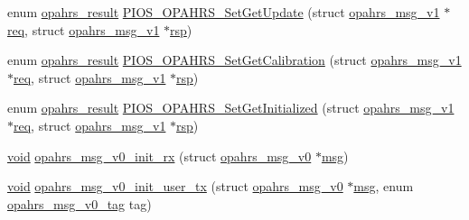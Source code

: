 \begin{DoxyCompactItemize}
\item 
enum \hyperlink{group___p_i_o_s___o_p_a_h_r_s_gaf6fe64d28ea92983e870494d0a5d05bd}{opahrs\-\_\-result} \hyperlink{group___p_i_o_s___o_p_a_h_r_s_ga4633695459517529c7841b3d2bb5dccf}{P\-I\-O\-S\-\_\-\-O\-P\-A\-H\-R\-S\-\_\-\-Set\-Get\-Update} (struct \hyperlink{structopahrs__msg__v1}{opahrs\-\_\-msg\-\_\-v1} $\ast$\hyperlink{pios__opahrs__proto_8h_ad651fd9affe5ed0ac9abccd8e2791a2c}{req}, struct \hyperlink{structopahrs__msg__v1}{opahrs\-\_\-msg\-\_\-v1} $\ast$\hyperlink{pios__opahrs__proto_8h_a33704cbdda2899ee80b99a109f814568}{rsp})
\item 
enum \hyperlink{group___p_i_o_s___o_p_a_h_r_s_gaf6fe64d28ea92983e870494d0a5d05bd}{opahrs\-\_\-result} \hyperlink{group___p_i_o_s___o_p_a_h_r_s_gadc32051065da8842b2a3e4416783ff2a}{P\-I\-O\-S\-\_\-\-O\-P\-A\-H\-R\-S\-\_\-\-Set\-Get\-Calibration} (struct \hyperlink{structopahrs__msg__v1}{opahrs\-\_\-msg\-\_\-v1} $\ast$\hyperlink{pios__opahrs__proto_8h_ad651fd9affe5ed0ac9abccd8e2791a2c}{req}, struct \hyperlink{structopahrs__msg__v1}{opahrs\-\_\-msg\-\_\-v1} $\ast$\hyperlink{pios__opahrs__proto_8h_a33704cbdda2899ee80b99a109f814568}{rsp})
\item 
enum \hyperlink{group___p_i_o_s___o_p_a_h_r_s_gaf6fe64d28ea92983e870494d0a5d05bd}{opahrs\-\_\-result} \hyperlink{group___p_i_o_s___o_p_a_h_r_s_ga1c2a499e2354e0673f66656bcb4def7a}{P\-I\-O\-S\-\_\-\-O\-P\-A\-H\-R\-S\-\_\-\-Set\-Get\-Initialized} (struct \hyperlink{structopahrs__msg__v1}{opahrs\-\_\-msg\-\_\-v1} $\ast$\hyperlink{pios__opahrs__proto_8h_ad651fd9affe5ed0ac9abccd8e2791a2c}{req}, struct \hyperlink{structopahrs__msg__v1}{opahrs\-\_\-msg\-\_\-v1} $\ast$\hyperlink{pios__opahrs__proto_8h_a33704cbdda2899ee80b99a109f814568}{rsp})
\item 
\hyperlink{group___n_a_m_e_ga18028b8badbf1ea7e704ccac3c488e82}{void} \hyperlink{group___p_i_o_s___o_p_a_h_r_s_gaeca8bd2545ffcdc40f88cee84771efff}{opahrs\-\_\-msg\-\_\-v0\-\_\-init\-\_\-rx} (struct \hyperlink{structopahrs__msg__v0}{opahrs\-\_\-msg\-\_\-v0} $\ast$\hyperlink{group___o_s_d_module_ga31fe24ba18a63ea1e8cdb622e7ece509}{msg})
\item 
\hyperlink{group___n_a_m_e_ga18028b8badbf1ea7e704ccac3c488e82}{void} \hyperlink{group___p_i_o_s___o_p_a_h_r_s_ga2184406b8367c9a006819d0516de6125}{opahrs\-\_\-msg\-\_\-v0\-\_\-init\-\_\-user\-\_\-tx} (struct \hyperlink{structopahrs__msg__v0}{opahrs\-\_\-msg\-\_\-v0} $\ast$\hyperlink{group___o_s_d_module_ga31fe24ba18a63ea1e8cdb622e7ece509}{msg}, enum \hyperlink{group___p_i_o_s___o_p_a_h_r_s_gaac8774f1c099b105b9117e7949bcf797}{opahrs\-\_\-msg\-\_\-v0\-\_\-tag} tag)

\end{DoxyCompactItemize}
